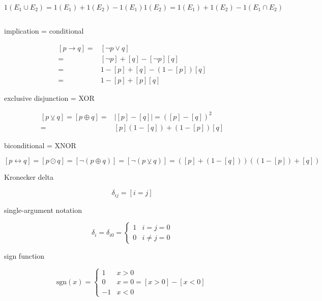 \documentclass[
]{book}
\theoremstyle{definition}
\theoremstyle{definition}
\theoremstyle{definition}
\theoremstyle{definition}
\theoremstyle{remark}
\begin{document}
\[
1\left(E_{{\scriptscriptstyle 1}}\cup E_{{\scriptscriptstyle 2}}\right)=1\left(E_{{\scriptscriptstyle 1}}\right)+1\left(E_{{\scriptscriptstyle 2}}\right)-1\left(E_{{\scriptscriptstyle 1}}\right)1\left(E_{{\scriptscriptstyle 2}}\right)=1\left(E_{{\scriptscriptstyle 1}}\right)+1\left(E_{{\scriptscriptstyle 2}}\right)-1\left(E_{{\scriptscriptstyle 1}}\cap E_{{\scriptscriptstyle 2}}\right)
\]

\[
\tag*{$\Box$}
\]

implication = conditional

\[
\begin{aligned}
\left[p\rightarrow q\right]= & \left[\neg p\vee q\right]\\
= & \left[\neg p\right]+\left[q\right]-\left[\neg p\right]\left[q\right]\\
= & 1-\left[p\right]+\left[q\right]-\left(1-\left[p\right]\right)\left[q\right]\\
= & 1-\left[p\right]+\left[p\right]\left[q\right]
\end{aligned}
\]

exclusive disjunction = XOR

\[
\begin{aligned}
\left[p\veebar q\right]=\left[p\oplus q\right]= & \left|\left[p\right]-\left[q\right]\right|=\left(\left[p\right]-\left[q\right]\right)^{2}\\
= & \left[p\right]\left(1-\left[q\right]\right)+\left(1-\left[p\right]\right)\left[q\right]
\end{aligned}
\]

biconditional = XNOR

\[
\left[p\leftrightarrow q\right]=\left[p\odot q\right]=\left[\neg\left(p\oplus q\right)\right]=\left[\neg\left(p\veebar q\right)\right]=\left(\left[p\right]+\left(1-\left[q\right]\right)\right)\left(\left(1-\left[p\right]\right)+\left[q\right]\right)
\]

Kronecker delta

\[
\delta_{ij}=\left[i=j\right]
\]

single-argument notation

\[
\delta_{i}=\delta_{i0}=\begin{cases}
1 & i=j=0\\
0 & i\neq j=0
\end{cases}
\]

sign function

\[
\mathrm{sgn}\left(x\right)=\begin{cases}
1 & x>0\\
0 & x=0=\left[x>0\right]-\left[x<0\right]\\
-1 & x<0
\end{cases}
\]
\end{document}
